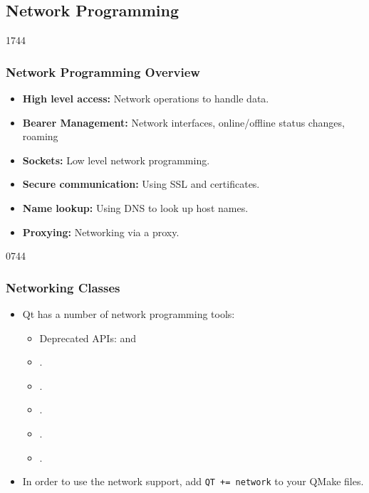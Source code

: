 \subsection{Network Programming}

\begin{slide}{1744}
\frametitle{Network Programming Overview}

\begin{itemize}

\item \textbf{High level access:} Network operations to handle data.
\item \textbf{Bearer Management:} Network interfaces, online/offline status changes, roaming
\item \textbf{Sockets:} Low level network programming.
\item \textbf{Secure communication:} Using SSL and certificates.
\item \textbf{Name lookup:} Using DNS to look up host names.
\item \textbf{Proxying:} Networking via a proxy.
\end{itemize}

\end{slide}

\begin{slide}[fragile]{0744}
\frametitle{Networking Classes} \label{network_programming}
  \begin{itemize}
  \item Qt has a number of network programming tools:
    \begin{itemize}
          \item Deprecated APIs:  and 
          \item {}.
        \item {}. 
        
        \item {}.
    \item {}.
    \item {}.
    \end{itemize}
    \item In order to use the network support, add \verb!QT += network! to
      your QMake files.
  \end{itemize}
\end{slide}

